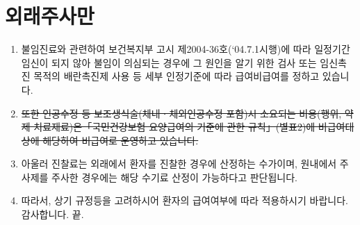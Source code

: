 \section{외래주사만}
%
{\begin{enumerate}\tightlist
\item 불임진료와 관련하여 보건복지부 고시 제2004-36호(‘04.7.1시행)에 따라 일정기간 임신이 되지 않아 불임이 의심되는 경우에 그 원인을 알기 위한 검사 또는 임신촉진 목적의 배란촉진제 사용 등 세부 인정기준에 따라 급여\bullet 비급여를 정하고 있습니다.
\item \sout{또한 인공수정 등 보조생식술(체내ㆍ체외인공수정 포함)시 소요되는 비용(행위, 약제 치료재료)은「국민건강보험 요양급여의 기준에 관한 규칙」(별표2)에 비급여대상에 해당하여 비급여로 운영하고 있습니다.}
\item 아울러 진찰료는 외래에서 환자를 진찰한 경우에 산정하는 수가이며, 원내에서 주사제를 주사한 경우에는 해당 수기료 산정이 가능하다고 판단됩니다.
\item 따라서, 상기 규정등을 고려하시어 환자의 급여여부에 따라 적용하시기 바랍니다. 감사합니다. 끝.
\end{enumerate}
}
